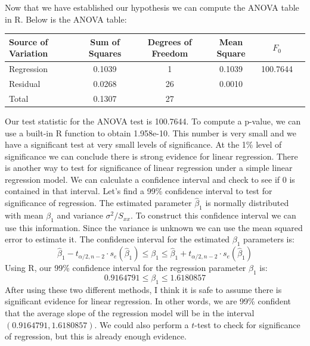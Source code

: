 \documentclass[12pt,letterpaper]{article}
\begin{document}
\vspace{4mm}

Now that we have established our hypothesis we can compute the ANOVA table in R. Below is the ANOVA table:

\begin{center}
\begin{tabular}{lccccc}
	\hline
	Source of Variation & Sum of Squares & Degrees of Freedom & Mean Square & $F_0$\\
	\hline
	Regression & 0.1039 & 1 & 0.1039 & 100.7644\\
	Residual & 0.0268 & 26 & 0.0010 &\\
	Total & 0.1307 & 27 & &\\
	\hline
\end{tabular}
\end{center}

Our test statistic for the ANOVA test is 100.7644. To compute a p-value, we can use a built-in R function to obtain 1.958e-10. This number is very small and we have a significant test at very small levels of significance. At the 1\% level of significance we can conclude there is strong evidence for linear regression. There is another way to test for significance of linear regression under a simple linear regression model. We can calculate a confidence interval and check to see if 0 is contained in that interval. Let's find a 99\% confidence interval to test for significance of regression. The estimated parameter $\hat{\beta}_1$ is normally distributed with mean $\beta_1$ and variance $\sigma^2/S_{xx}$. To construct this confidence interval we can use this information. Since the variance is unknown we can use the mean squared error to estimate it. The confidence interval for the estimated $\beta_1$ parameters is: $$\hat{\beta}_1-t_{\alpha/2,n-2}\cdot s_e\left(\hat{\beta}_1\right)\leq \beta_1\leq \hat{\beta}_1+t_{\alpha/2,n-2}\cdot s_e\left(\hat{\beta}_1\right)$$ Using R, our 99\% confidence interval for the regression parameter $\beta_1$ is: $$0.9164791\leq \beta_1\leq 1.6180857$$ After using these two different methods, I think it is safe to assume there is significant evidence for linear regression. In other words, we are 99\% confident that the average slope of the regression model will be in the interval $(0.9164791,1.6180857)$. We could also perform a $t$-test to check for significance of regression, but this is already enough evidence.\\[2mm]
\end{document}
